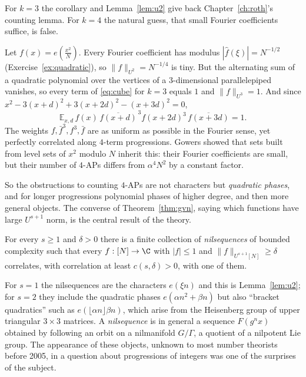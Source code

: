 For $k=3$ the corollary and Lemma~\ref{lem:u2} give back Chapter~\ref{ch:roth}'s counting lemma. For $k=4$ the natural guess, that small Fourier coefficients suffice, is false.

\begin{example}\label{ex:quadphase}
Let $f(x)=e(\frac{x^2}N)$. Every Fourier coefficient has modulus $|\hat f(\xi)|=N^{-1/2}$ (Exercise~\ref{ex:quadratic}), so $\|f\|_{U^2}=N^{-1/4}$ is tiny. But the alternating sum of a quadratic polynomial over the vertices of a $3$-dimensional parallelepiped vanishes, so every term of \eqref{eq:cube} for $k=3$ equals $1$ and $\|f\|_{U^3}=1$. And since $x^2-3(x+d)^2+3(x+2d)^2-(x+3d)^2=0$,
\[
\mathbb E_{x,d}\,f(x)\,\overline{f(x+d)}^{\,3}f(x+2d)^3\,\overline{f(x+3d)}=1.
\]
The weights $f,\bar f^3,f^3,\bar f$ are as uniform as possible in the Fourier sense, yet perfectly correlated along $4$-term progressions. Gowers showed that sets built from level sets of $x^2$ modulo $N$ inherit this: their Fourier coefficients are small, but their number of $4$-APs differs from $\alpha^4N^2$ by a constant factor.
\end{example}

So the obstructions to counting $4$-APs are not characters but \emph{quadratic phases}, and for longer progressions polynomial phases of higher degree, and then more general objects. The converse of Theorem~\ref{thm:gvn}, saying which functions have large $U^{s+1}$ norm, is the central result of the theory.

\begin{theorem}\label{thm:inverse}
For every $s\ge1$ and $\delta>0$ there is a finite collection of \emph{nilsequences} of bounded complexity such that every $f:[N]\to\C$ with $|f|\le1$ and $\|f\|_{U^{s+1}[N]}\ge\delta$ correlates, with correlation at least $c(s,\delta)>0$, with one of them.
\end{theorem}

For $s=1$ the nilsequences are the characters $e(\xi n)$ and this is Lemma~\ref{lem:u2}; for $s=2$ they include the quadratic phases $e(\alpha n^2+\beta n)$ but also ``bracket quadratics'' such as $e(\lfloor\alpha n\rfloor\beta n)$, which arise from the Heisenberg group of upper triangular $3\times3$ matrices. A \emph{nilsequence} is in general a sequence $F(g^nx)$ obtained by following an orbit on a nilmanifold $G/\Gamma$, a quotient of a nilpotent Lie group. The appearance of these objects, unknown to most number theorists before 2005, in a question about progressions of integers was one of the surprises of the subject.

